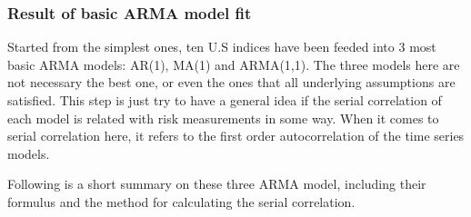 \documentclass[11pt]{article}
\begin{document}
\subsubsection{Result of basic ARMA model fit}
Started from the simplest ones, ten U.S indices have been feeded into 3 most basic ARMA models: AR(1), MA(1) and ARMA(1,1). The three models here are not necessary the best one, or even the ones that all underlying assumptions are satisfied. This step is just try to have a general idea if the serial correlation of each model is related with risk measurements in some way. When it comes to serial correlation here, it refers to the first order autocorrelation of the time series models. 

Following is a short summary on these three ARMA model, including their formulus and the method for calculating the serial correlation.
\end{document}
